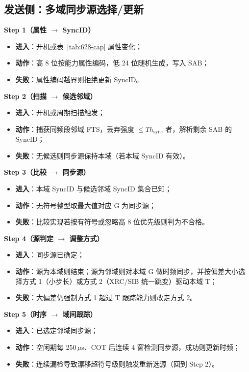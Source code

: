 \documentclass[11pt,a4paper]{ctexart}
\begin{document}
\subsection{发送侧：多域同步源选择/更新}

\textbf{Step 1（属性 $\rightarrow$ SyncID）}
\begin{itemize}[nosep]
  \item \textbf{进入}：开机或表~\ref{tab:628-cap} 属性变化；
  \item \textbf{动作}：高 8 位按能力属性编码，低 24 位随机生成，写入 SAB；
  \item \textbf{失败}：属性编码越界则拒绝更新 SyncID。
\end{itemize}

\textbf{Step 2（扫描 $\rightarrow$ 候选邻域）}
\begin{itemize}[nosep]
  \item \textbf{进入}：开机或周期扫描触发；
  \item \textbf{动作}：捕获同频段邻域 FTS，丢弃强度 $\le Th_{\mathrm{sync}}$ 者，解析剩余 SAB 的 SyncID；
  \item \textbf{失败}：无候选则同步源保持本域（若本域 SyncID 有效）。
\end{itemize}

\textbf{Step 3（比较 $\rightarrow$ 同步源）}
\begin{itemize}[nosep]
  \item \textbf{进入}：本域 SyncID 与候选邻域 SyncID 集合已知；
  \item \textbf{动作}：无符号整型取最大值对应 G 为同步源；
  \item \textbf{失败}：比较实现若按有符号或忽略高 8 位优先级则判为不合格。
\end{itemize}

\textbf{Step 4（源判定 $\rightarrow$ 调整方式）}
\begin{itemize}[nosep]
  \item \textbf{进入}：同步源已确定；
  \item \textbf{动作}：源为本域则结束；源为邻域则对本域 G 做时频同步，并按偏差大小选择方式 1（小步长）或方式 2（XRC/SIB 统一跳变）驱动本域 T；
  \item \textbf{失败}：大偏差仍强制方式 1 超过 T 跟踪能力则改走方式 2。
\end{itemize}

\textbf{Step 5（时序 $\rightarrow$ 域间跟踪）}
\begin{itemize}[nosep]
  \item \textbf{进入}：已选定邻域同步源；
  \item \textbf{动作}：空闲期每 250\,$\mu$s、COT 后连续 4 窗检测同步源，成功则更新时频；
  \item \textbf{失败}：连续漏检导致漂移超符号级则触发重新选源（回到 Step 2）。
\end{itemize}
\end{document}
